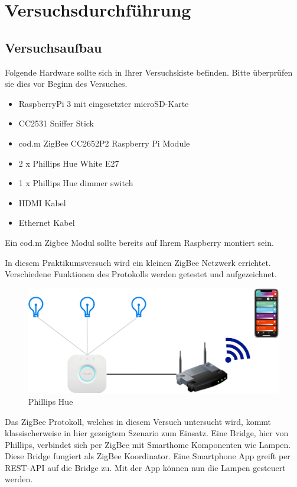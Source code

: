 \chapter{Versuchsdurchführung}

\section{Versuchsaufbau}

Folgende Hardware sollte sich in Ihrer Versuchskiste befinden. Bitte überprüfen sie dies vor Beginn des Versuches.

\begin{itemize}
    \item RaspberryPi 3 mit eingesetzter microSD-Karte
    \item CC2531 Sniffer Stick
    \item cod.m ZigBee CC2652P2 Raspberry Pi Module
    \item 2 x Phillips Hue White E27
    \item 1 x Phillips Hue dimmer switch
    \item HDMI Kabel
    \item Ethernet Kabel
\end{itemize}

Ein cod.m Zigbee Modul sollte bereits auf Ihrem Raspberry montiert sein. 

In diesem Praktikumsversuch wird ein kleinen ZigBee Netzwerk errichtet. Verschiedene Funktionen des Protokolls werden getestet und aufgezeichnet.


\begin{figure}[H]
    \centering
    \includegraphics[width=1\textwidth]{media/zbhue.png}
    \caption{Phillips Hue}
\end{figure}
Das ZigBee Protokoll, welches in diesem Versuch untersucht wird, kommt klassischerweise in hier gezeigtem Szenario zum Einsatz.
Eine Bridge, hier von Phillips, verbindet sich per ZigBee mit Smarthome Komponenten wie Lampen. Diese Bridge fungiert als ZigBee Koordinator. 
Eine Smartphone App greift per REST-API auf die Bridge zu. Mit der App können nun die Lampen gesteuert werden.

